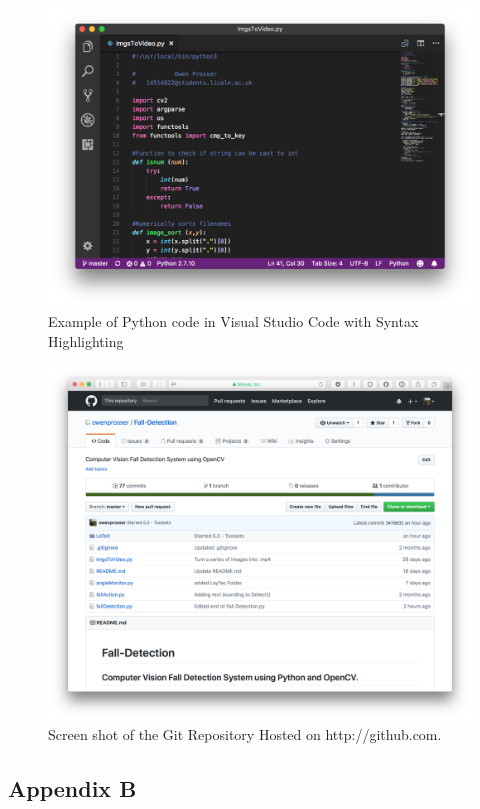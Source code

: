 \documentclass[11pt,a4paper]{report}
\begin{document}
\begin{figure}[H]
 \centering
 \includegraphics[scale = 0.4]{VSCode.png}
 \caption{Example of Python code in Visual Studio Code with Syntax Highlighting}
 \label{fig:VSCode}
\end{figure}

\begin{figure}[H]
 \centering
 \includegraphics[scale = 0.14]{GitRepo.png}
 \caption{Screen shot of the Git Repository Hosted on http://github.com.}
 \label{fig:GitRepo}
\end{figure}

\subsection{Appendix B}
\end{document}
